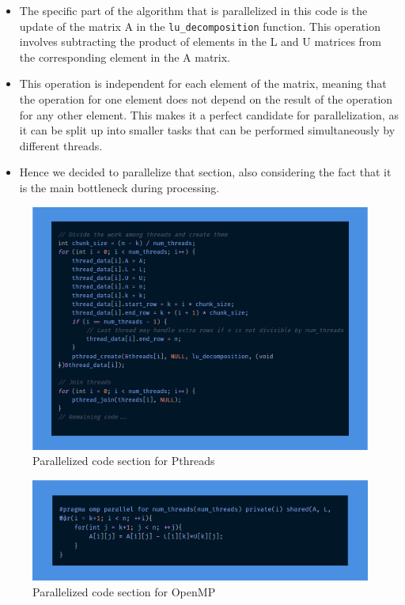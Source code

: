 \documentclass{article}
\begin{document}
\begin{itemize}
	\item The specific part of the algorithm that is parallelized in this code is the update of the matrix A in the \verb|lu_decomposition| function. This operation involves subtracting the product of elements in the L and U matrices from the corresponding element in the A matrix.
	\item This operation is independent for each element of the matrix, meaning that the operation for one element does not depend on the result of the operation for any other element. This makes it a perfect candidate for parallelization, as it can be split up into smaller tasks that can be performed simultaneously by different threads.
	\item Hence we decided to parallelize that section, also considering the fact that it is the main bottleneck during processing.
\end{itemize}

\begin{figure}[!htb]
    \centering
    \includegraphics[width=13cm]{pthread_code.png}
    \caption{Parallelized code section for Pthreads}
\end{figure}

\begin{figure}[!htb]
    \centering
    \includegraphics[width=13cm]{omp_code.png}
    \caption{Parallelized code section for OpenMP}
\end{figure}
\end{document}
